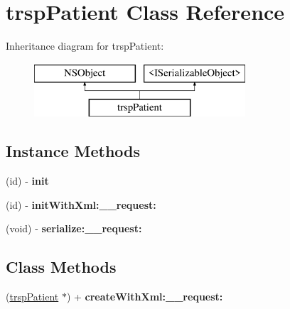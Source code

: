 \hypertarget{interfacetrsp_patient}{}\section{trsp\+Patient Class Reference}
\label{interfacetrsp_patient}
Inheritance diagram for trsp\+Patient\+:\begin{figure}[H]
\begin{center}
\leavevmode
\includegraphics[height=2.000000cm]{interfacetrsp_patient}
\end{center}
\end{figure}
\subsection*{Instance Methods}
\begin{DoxyCompactItemize}
\item 
\hypertarget{interfacetrsp_patient_a6d61c66166d987386cf6be5665b4e6c6}{}(id) -\/ {\bfseries init}\label{interfacetrsp_patient_a6d61c66166d987386cf6be5665b4e6c6}

\item 
\hypertarget{interfacetrsp_patient_ab205d734948f130f84210c10e20f1c93}{}(id) -\/ {\bfseries init\+With\+Xml\+:\+\_\+\+\_\+request\+:}\label{interfacetrsp_patient_ab205d734948f130f84210c10e20f1c93}

\item 
\hypertarget{interfacetrsp_patient_a27418bc942ea520092126585a90671bf}{}(void) -\/ {\bfseries serialize\+:\+\_\+\+\_\+request\+:}\label{interfacetrsp_patient_a27418bc942ea520092126585a90671bf}

\end{DoxyCompactItemize}
\subsection*{Class Methods}
\begin{DoxyCompactItemize}
\item 
\hypertarget{interfacetrsp_patient_ae0a4738182ef6b8998b6b02ab717e1f6}{}(\hyperlink{interfacetrsp_patient}{trsp\+Patient} $\ast$) + {\bfseries create\+With\+Xml\+:\+\_\+\+\_\+request\+:}\label{interfacetrsp_patient_ae0a4738182ef6b8998b6b02ab717e1f6}

\end{DoxyCompactItemize}

